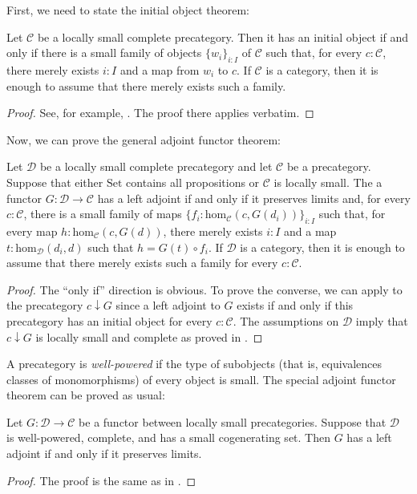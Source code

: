 \documentclass[reqno]{amsart}
\theoremstyle{definition}
\theoremstyle{remark}
\newcommand{\fs}[1]{\mathrm{#1}}
\newcommand{\scat}[1]{\mathcal{#1}}
\renewcommand{\hom}{\fs{hom}}
\newcommand{\uSet}{\fs{Set}}
\numberwithin{figure}{section}
\begin{document}
First, we need to state the initial object theorem:

\begin{lem}[initial]
Let $\scat{C}$ be a locally small complete precategory.
Then it has an initial object if and only if there is a small family of objects $\{ w_i \}_{i : I}$ of $\scat{C}$ such that, for every $c : \scat{C}$, there merely exists $i : I$ and a map from $w_i$ to $c$.
If $\scat{C}$ is a category, then it is enough to assume that there merely exists such a family.
\end{lem}
\begin{proof}
See, for example, \cite[Theorem~V.6.1]{maclane}.
The proof there applies verbatim.
\end{proof}

Now, we can prove the general adjoint functor theorem:

\begin{thm}[gaft]
Let $\scat{D}$ be a locally small complete precategory and let $\scat{C}$ be a precategory.
Suppose that either $\uSet$ contains all propositions or $\scat{C}$ is locally small.
The a functor $G : \scat{D} \to \scat{C}$ has a left adjoint if and only if it preserves limits and, for every $c : \scat{C}$, there is a small family of maps $\{ f_i : \hom_\scat{C}(c,G(d_i)) \}_{i : I}$
such that, for every map $h : \hom_\scat{C}(c,G(d))$, there merely exists $i : I$ and a map $t : \hom_\scat{D}(d_i,d)$ such that $h = G(t) \circ f_i$.
If $\scat{D}$ is a category, then it is enough to assume that there merely exists such a family for every $c : \scat{C}$.
\end{thm}
\begin{proof}
The ``only if'' direction is obvious.
To prove the converse, we can apply  to the precategory $c \downarrow G$ since a left adjoint to $G$ exists if and only if this precategory has an initial object for every $c : \scat{C}$.
The assumptions on $\scat{D}$ imply that $c \downarrow G$ is locally small and complete as proved in \cite[Theorem~V.6.2]{maclane}.
\end{proof}

A precategory is \emph{well-powered} if the type of subobjects (that is, equivalences classes of monomorphisms) of every object is small.
The special adjoint functor theorem can be proved as usual:

\begin{thm}[saft]
Let $G : \scat{D} \to \scat{C}$ be a functor between locally small precategories.
Suppose that $\scat{D}$ is well-powered, complete, and has a small cogenerating set.
Then $G$ has a left adjoint if and only if it preserves limits.
\end{thm}
\begin{proof}
The proof is the same as in \cite[Theorem~V.8.2]{maclane}.
\end{proof}
\end{document}
